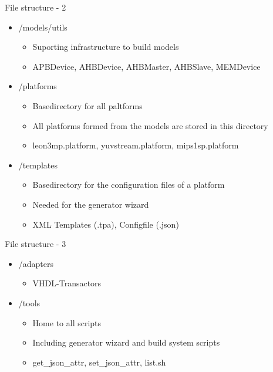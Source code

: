 \documentclass[fleqn,11pt,aspectratio=43]{beamer}
\begin{document}
\begin{frame}{File structure - 2}

\begin{itemize}
  \item /models/utils
  \begin{itemize}
    \item Suporting infrastructure to build models
    \item APBDevice, AHBDevice, AHBMaster, AHBSlave, MEMDevice
  \end{itemize}
  \item /platforms
  \begin{itemize}
    \item Basedirectory for all paltforms
    \item All platforms formed from the models are stored in this directory
    \item leon3mp.platform, yuvstream.platform, mips1sp.platform
  \end{itemize}
  \item /templates
  \begin{itemize}
    \item Basedirectory for the configuration files of a platform
    \item Needed for the generator wizard
    \item XML Templates (.tpa), Configfile (.json)
  \end{itemize}
\end{itemize}
\end{frame}

\begin{frame}{File structure - 3}

\begin{itemize}
  \item /adapters
  \begin{itemize}
    \item VHDL-Transactors
  \end{itemize}
  \item /tools
  \begin{itemize}
    \item Home to all scripts
    \item Including generator wizard and build system scripts
    \item get\_json\_attr, set\_json\_attr, list.sh
  \end{itemize}
\end{itemize}
\end{frame}
\end{document}
